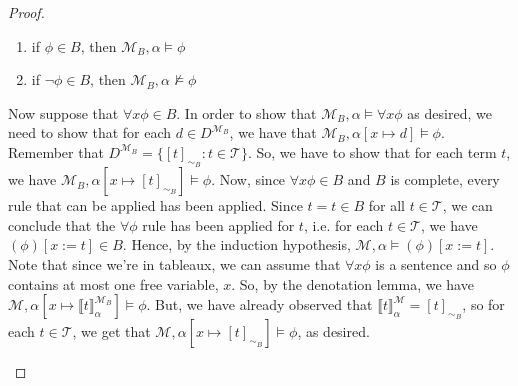 \begin{enumerate}[\thesection.1]
\begin{proof}
\begin{enumerate}[(i)]
                              \begin{enumerate}[1.]

                              \item if $\phi\in B$, then
                        $\mathcal{M}_B,\alpha\vDash\phi$

                              \item if $\neg\phi\in B$, then
                          $\mathcal{M}_B,\alpha\nvDash\phi$ 
                      
                             \end{enumerate}

                             Now suppose that $\forall x\phi\in B$. In
                             order to show that
                             $\mathcal{M}_B,\alpha\vDash\forall x\phi$
                             as desired, we need to show that for each
                             $d\in D^{\mathcal{M}_B}$, we have that
                             $\mathcal{M}_B,\alpha[x\mapsto
                             d]\vDash\phi$. Remember that
                             $D^{\mathcal{M}_B}=\{[t]_{\sim_B}:t\in\mathcal{T}\}$.
                             So, we have to show that for each term
                             $t$, we have $\mathcal{M}_B,\alpha[x\mapsto
                             [t]_{\sim_B}]\vDash\phi$. Now, since
                             $\forall x\phi\in B$ and $B$ is complete,
                             every rule that can be applied has been
                             applied. Since $t=t\in B$ for all
                             $t\in\mathcal{T}$, we can conclude that
                             the $\forall \phi$ rule has been applied
                             for $t$, i.e. for each $t\in\mathcal{T}$,
                             we have $(\phi)[x:=t]\in B$. Hence, by
                             the induction hypothesis,
                             $\mathcal{M},\alpha\vDash(\phi)[x:=t]$. 
                             Note that
                             since we're in tableaux, we can assume
                             that $\forall 
                             x\phi$ is a sentence and so $\phi$
                             contains at most one free variable,
                             $x$. So, by the denotation lemma, we have
                             $\mathcal{M},\alpha[x\mapsto \llbracket
                             t\rrbracket_\alpha^{\mathcal{M}_B}]\vDash
                             \phi$. But, we have already observed that $\llbracket
                            t\rrbracket_\alpha^\mathcal{M}=[t]_{\sim_B}$,
                            so for each $t\in\mathcal{T}$, we get that
                            $\mathcal{M},\alpha[x\mapsto [t]_{\sim_B}]\vDash
                            \phi$, as desired.


\end{enumerate}
\end{proof}
\end{enumerate}
